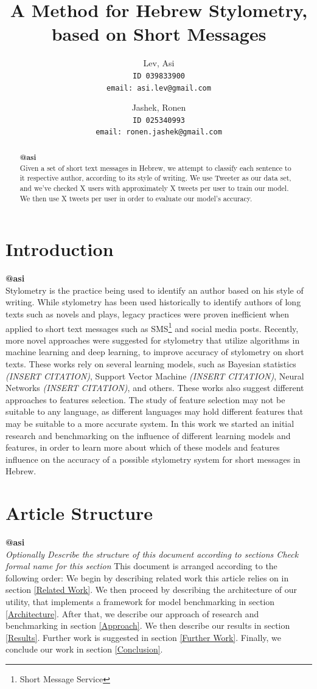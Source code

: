 \documentclass[a4paper]{article}
\author{Lev, Asi\\
	\texttt{ID 039833900}\\
	\texttt{email: asi.lev@gmail.com}
\and
	Jashek, Ronen\\
	\texttt{ID 025340993}\\
	\texttt{email: ronen.jashek@gmail.com}	
}
\title{A Method for Hebrew Stylometry, based on Short Messages}
\date{}
\begin{document}
\maketitle
\begin{abstract}
\textbf{@asi}\\
Given a set of short text messages in Hebrew, we attempt to classify each sentence to it respective author, according to its style of writing.
We use Tweeter as our data set, and we've checked X users with approximately X tweets per user to train our model.
We then use X tweets per user in order to evaluate our model's accuracy.
\end{abstract}
\section{Introduction}
\textbf{@asi}\\
Stylometry is the practice being used to identify an author based on his style of writing.
While stylometry has been used historically to identify authors of long texts such as novels and plays, legacy practices were proven inefficient when applied to short text messages such as SMS\footnote{Short Message Service} and social media posts.
Recently, more novel approaches were suggested for stylometry that utilize algorithms in machine learning and deep learning, to improve accuracy of stylometry on short texts.
These works rely on several learning models, such as Bayesian statistics \emph{(INSERT CITATION)}, Support Vector Machine \emph{(INSERT CITATION)}, Neural Networks \emph{(INSERT CITATION)}, and others.
These works also suggest different approaches to features selection. The study of feature selection may not be suitable to any language, as different languages may hold different features that may be suitable to a more accurate system.
In this work we started an initial research and benchmarking on the influence of different learning models and features, in order to learn more about which of these models and features influence on the accuracy of a possible stylometry system for short messages in Hebrew.
\section{Article Structure}
\textbf{@asi}\\
\emph{Optionally
Describe the structure of this document according to sections
Check formal name for this section
}
This document is arranged according to the following order:
We begin by describing related work this article relies on in section \ref{Related Work}.
We then proceed by describing the architecture of our utility, that implements a framework for model benchmarking in section \ref{Architecture}.
After that, we describe our approach of research and benchmarking in section \ref{Approach}.
We then describe our results in section \ref{Results}.
Further work is suggested in section \ref{Further Work}.
Finally, we conclude our work in section \ref{Conclusion}.
\end{document}
